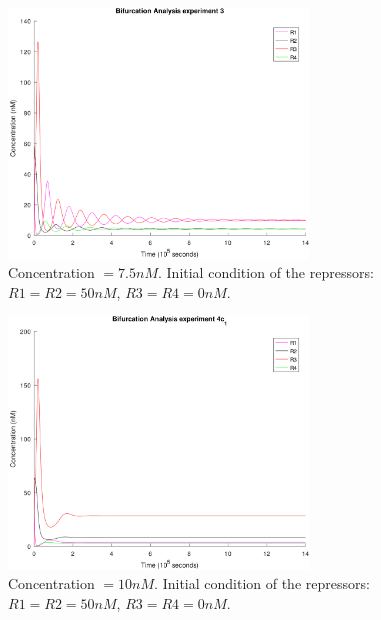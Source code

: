     \begin{figure}[!htbp]
      \centering
      \includegraphics[width=0.71\textwidth]{img/bifurcation-3-1.png}
      \caption{Concentration $= 7.5nM$. Initial condition of the repressors: $R1 = R2 = 50nM$, $R3 = R4 = 0nM$.}
      \label{fig.bifurcation-3}
    \end{figure}

    \begin{figure}[!htbp]
      \centering
      \includegraphics[width=0.71\textwidth]{img/bifurcation-4c1-1.png}
      \caption{Concentration $= 10nM$. Initial condition of the repressors: $R1 = R2 = 50nM$, $R3 = R4 = 0nM$.}
      \label{fig.bifurcation-4c1}
    \end{figure}

